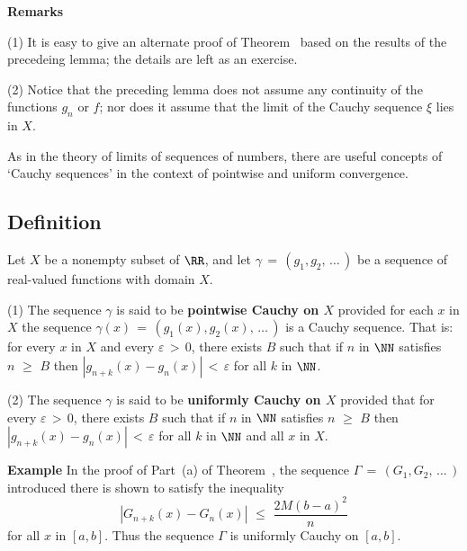 \V

        {\bf Remarks}

\V

        (1) It is easy to give an alternate proof of Theorem~ based on the results of the precedeing lemma;
    the details are left as an exercise.

\V

        (2) Notice that the preceding lemma does not assume any continuity of the functions $g_{n}$ or $f$;
    nor does it assume that the limit of the Cauchy sequence ${\xi}$ lies in $X$.

\V
\V

        As in the theory of limits of sequences of numbers, there are useful concepts of `Cauchy sequences' in the context of pointwise and uniform convergence.

\V

            \subsection{\small{\bf Definition}}
            \label{DefF05.60}

\V

        Let $X$ be a nonempty subset of ${\RR}$, and let ${\gamma} \,=\, (g_{1},g_{2},\,{\ldots}\,)$ be a sequence of real-valued functions with domain $X$.

\V

        (1) The sequence ${\gamma}$ is said to be {\bf pointwise Cauchy on $X$} provided for each $x$ in $X$ the sequence ${\gamma}(x) \,=\, (g_{1}(x),g_{2}(x),\,{\ldots}\,)$ is a Cauchy sequence.
    That is: for every $x$ in $X$ and every ${\varepsilon}\,>\,0$, there exists $B$ such that  if $n$ in ${\NN}$ satisfies $n\,\,{\geq}\,\,B$ then $|g_{n+k}(x)-g_{n}(x)|\,<\,{\varepsilon}$ for all $k$ in ${\NN}$.

\V


        (2) The sequence ${\gamma}$ is said to be {\bf uniformly Cauchy on $X$} provided that
        for every ${\varepsilon}\,>\,0$, there exists $B$ such that if $n$ in ${\NN}$ satisfies $n\,\,{\geq}\,\,B$ then $|g_{n+k}(x)-g_{n}(x)|\,<\,{\varepsilon}$ for all $k$ in ${\NN}$ and all $x$ in $X$.

\V

        {\bf Example} In the proof of Part~(a) of Theorem~, the sequence ${\Gamma} \,=\, (G_{1},G_{2},\,{\ldots}\,)$ introduced there is shown to satisfy the inequality
        \begin{displaymath}
        \left|G_{n+k}(x)-G_{n}(x)\right|\,\,{\leq}\,\,\frac{2M(b-a)^{2}}{n}
        \end{displaymath}
    for all $x$ in $[a,b]$.
    Thus the sequence ${\Gamma}$ is uniformly Cauchy on $[a,b]$.

